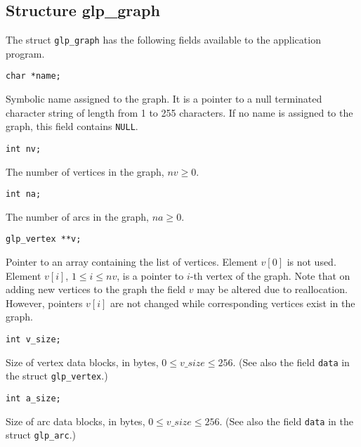 \documentclass[11pt]{report}
\def\para#1{\noindent{\bf#1}}
\begin{document}
\newenvironment{comment}
{\addtolength{\leftskip}{16pt}\noindent}
{\par\addtolength{\leftskip}{-16pt}}

\subsection{Structure glp\_graph}

The struct \verb|glp_graph| has the following fields available to the
application program.

\noindent
\verb|char *name;|

\begin{comment}Symbolic name assigned to the graph. It is a pointer to
a null terminated character string of length from 1 to 255 characters.
If no name is assigned to the graph, this field contains \verb|NULL|.
\end{comment}

\noindent
\verb|int nv;|

\begin{comment}The number of vertices in the graph, $nv\geq 0$.
\end{comment}

\noindent
\verb|int na;|

\begin{comment}The number of arcs in the graph, $na\geq 0$.
\end{comment}

\newpage

\noindent
\verb|glp_vertex **v;|

\begin{comment}Pointer to an array containing the list of vertices.
Element $v[0]$ is not used. Element $v[i]$, $1\leq i\leq nv$, is a
pointer to $i$-th vertex of the graph. Note that on adding new vertices
to the graph the field $v$ may be altered due to reallocation. However,
pointers $v[i]$ are not changed while corresponding vertices exist in
the graph.
\end{comment}

\noindent
\verb|int v_size;|

\begin{comment}Size of vertex data blocks, in bytes,
$0\leq v\_size\leq 256$. (See also the field \verb|data| in the struct
\verb|glp_vertex|.)
\end{comment}

\noindent
\verb|int a_size;|

\begin{comment}Size of arc data blocks, in bytes,
$0\leq v\_size\leq 256$. (See also the field \verb|data| in the struct
\verb|glp_arc|.)
\end{comment}
\end{document}

